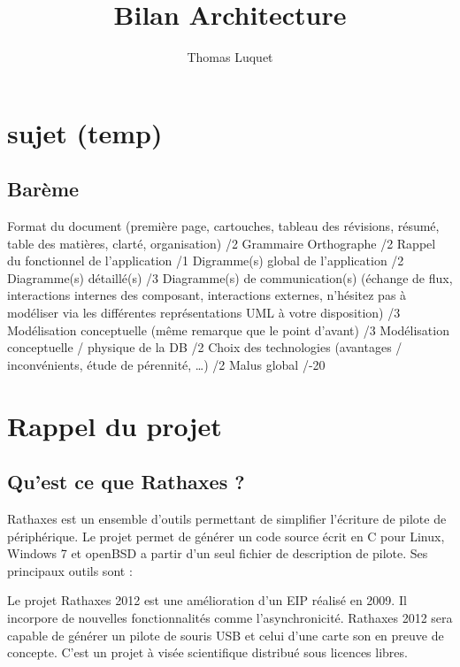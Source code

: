 \documentclass{rtxreport}
\author{Thomas Luquet}
\title{Bilan Architecture}
\begin{document}
\maketitle

\rtxmaketitleblock

\tableofcontents

\chapter{sujet (temp)}

\section{Barème}

Format du document (première page, cartouches, tableau des révisions, résumé, table des matières, clarté, organisation) /2
Grammaire Orthographe /2
Rappel du fonctionnel de l'application /1
Digramme(s) global de l'application /2
Diagramme(s) détaillé(s) /3
Diagramme(s) de communication(s) (échange de flux, interactions internes des composant, interactions externes, n'hésitez pas à modéliser via les différentes représentations UML à votre disposition) /3
Modélisation conceptuelle (même remarque que le point d'avant) /3
Modélisation conceptuelle / physique de la DB /2
Choix des technologies (avantages / inconvénients, étude de pérennité, …) /2
Malus global /-20

\chapter{Rappel du projet}

\section{Qu'est ce que Rathaxes ?} 

Rathaxes est un ensemble d'outils permettant de simplifier l'écriture de pilote de périphérique. Le projet permet de générer un code source écrit en C pour Linux, Windows 7 et openBSD a partir d'un seul fichier de description de pilote.
Ses principaux outils sont :

Le projet Rathaxes 2012 est une amélioration d'un EIP réalisé en 2009. Il incorpore de nouvelles fonctionnalités comme l’asynchronicité. 
Rathaxes 2012 sera capable de générer un pilote de souris USB et celui d'une carte son en preuve de concepte.
C'est un projet à visée scientifique distribué sous licences libres.
\end{document}

